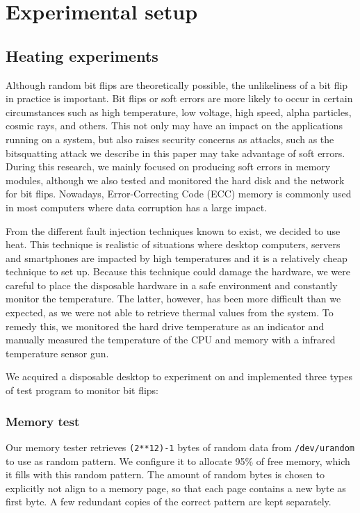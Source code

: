 \documentclass[conference]{IEEEtran}
\begin{document}
\section{Experimental setup}\label{sec:setup}

\subsection{Heating experiments}

Although random bit flips are theoretically possible, the unlikeliness of a bit
flip in practice is important. Bit flips or soft errors are more likely to
occur in certain circumstances such as high temperature, low voltage, high
speed, alpha particles, cosmic rays, and others. This not only may have an
impact on the applications running on a system, but also raises security
concerns as attacks, such as the bitsquatting attack we describe in this paper
may take advantage of soft errors. During this research, we mainly focused on
producing soft errors in memory modules, although we also tested and monitored
the hard disk and the network for bit flips. Nowadays, Error-Correcting Code
(ECC) memory is commonly used in most computers where data corruption has a
large impact.

From the different fault injection techniques known to
exist\cite{barenghi2012fault}, we decided to use heat. This technique is
realistic of situations where desktop computers, servers and smartphones are
impacted by high temperatures and it is a relatively cheap technique to set up.
Because this technique could damage the hardware, we were careful to place the
disposable hardware in a safe environment and constantly monitor the
temperature. The latter, however, has been more difficult than we expected, as
we were not able to retrieve thermal values from the system. To remedy this, we
monitored the hard drive temperature as an indicator and manually measured the
temperature of the CPU and memory with a infrared temperature sensor gun.

We acquired a disposable desktop to experiment on and implemented three types
of test program to monitor bit flips:

\subsubsection{Memory test}

Our memory tester retrieves \texttt{(2**12)-1} bytes of random data from
\texttt{/dev/urandom} to use as random pattern. We configure it to allocate
95\% of free memory, which it fills with this random pattern. The amount of
random bytes is chosen to explicitly not align to a memory page, so that each
page contains a new byte as first byte. A few redundant copies of the correct
pattern are kept separately.
\end{document}
